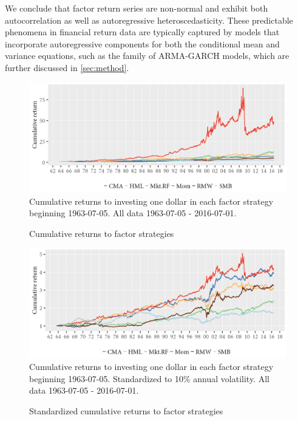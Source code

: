 We conclude that factor return series are non-normal and exhibit both autocorrelation as well as autoregressive heteroscedasticity. These predictable phenomena in financial return data are typically captured by models that incorporate autoregressive components for both the conditional mean and variance equations, such as the family of ARMA-GARCH models, which are further discussed in \autoref{sec:method}.
\begin{figure}[H]
  \caption{Cumulative returns to factor strategies}
  \label{diag:cumret}
  \centering
  \begin{minipage}{\textwidth}
  \includegraphics[scale=1]{graphics/cumretPlot.png}  
  \vspace{3mm}
  \footnotesize
  Cumulative returns to investing one dollar in each factor strategy beginning 1963-07-05.  All data 1963-07-05 - 2016-07-01.
  \end{minipage}
\end{figure}
\begin{figure}[H]
  \caption{Standardized cumulative returns to factor strategies}
  \label{diag:cumretstd}
  \centering
  \begin{minipage}{\textwidth}
  \includegraphics[scale=1]{graphics/cumretStdPlot.png}  
  \vspace{3mm}
  \footnotesize
  Cumulative returns to investing one dollar in each factor strategy beginning 1963-07-05. Standardized to 10\% annual volatility. All data 1963-07-05 - 2016-07-01.
  \end{minipage}
\end{figure}

